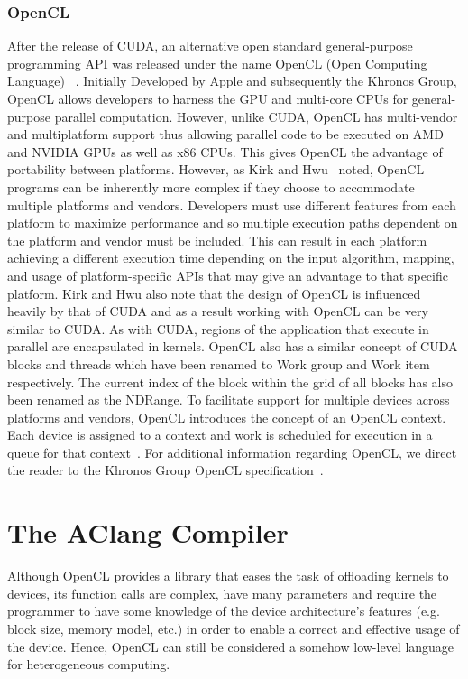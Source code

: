 \documentclass[Ingles]{ic-tese-v1}
\begin{document}
\subsubsection{OpenCL}

After the release of CUDA, an alternative open standard general-purpose programming
API was released under the name OpenCL (Open Computing Language) ~\cite{Kirk:2012}.
Initially Developed by Apple and subsequently the Khronos Group, OpenCL allows
developers to harness the GPU and multi-core CPUs for general-purpose parallel
computation. However, unlike CUDA, OpenCL has multi-vendor and multiplatform
support thus allowing parallel code to be executed on AMD and NVIDIA GPUs
as well as x86 CPUs. This gives OpenCL the advantage of portability between
platforms. However, as Kirk and Hwu~\cite{Kirk:2012} noted, OpenCL programs can be inherently more complex if they choose to accommodate multiple platforms and vendors.
Developers must use different features from each platform to maximize performance
and so multiple execution paths dependent on the platform and vendor must be
included. This can result in each platform achieving a different execution time
depending on the input algorithm, mapping, and usage of platform-specific APIs
that may give an advantage to that specific platform. Kirk and Hwu also note
that the design of OpenCL is influenced heavily by that of CUDA and as a result
working with OpenCL can be very similar to CUDA. As with CUDA, regions of
the application that execute in parallel are encapsulated in kernels. OpenCL also
has a similar concept of CUDA blocks and threads which have been renamed to
Work group and Work item respectively. The current index of the block within the
grid of all blocks has also been renamed as the NDRange. To facilitate support for
multiple devices across platforms and vendors, OpenCL introduces the concept of
an OpenCL context. Each device is assigned to a context and work is scheduled
for execution in a queue for that context~\cite{Kirk:2012}. For additional information regarding OpenCL, we direct the reader to the Khronos Group OpenCL specification~\cite{opencl}.

\section{The AClang Compiler}
\label{sec:AClang}

Although OpenCL provides  a library that eases the  task of offloading
kernels  to  devices,  its  function  calls  are  complex,  have  many
parameters and  require the programmer  to have some knowledge  of the
device architecture's  features (e.g. block size,  memory model, etc.)
in order to enable a correct and effective usage of the device. Hence,
OpenCL  can  still  be  considered a  somehow  low-level  language  for
heterogeneous computing.
\end{document}
